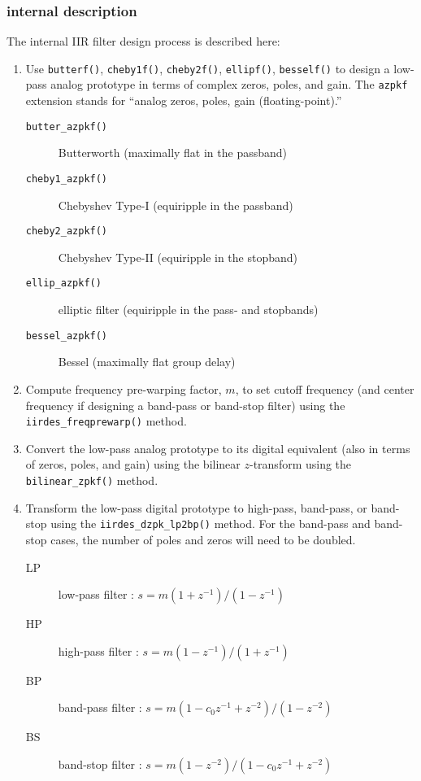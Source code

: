 \subsubsection{internal description}
\label{module:filter:iirdes:internal}
The internal IIR filter design process is described here:
\begin{enumerate}
\item Use {\tt butterf()}, {\tt cheby1f()}, {\tt cheby2f()}, {\tt ellipf()},
      {\tt besself()} to design a low-pass analog prototype in terms of
      complex zeros, poles, and gain.
      The {\tt azpkf} extension stands for ``analog zeros, poles, gain
      (floating-point).''

    \begin{description}
    \item[{\tt butter\_azpkf()}] Butterworth (maximally flat in the passband)
    \item[{\tt cheby1\_azpkf()}] Chebyshev Type-I (equiripple in the passband)
    \item[{\tt cheby2\_azpkf()}] Chebyshev Type-II (equiripple in the stopband)
    \item[{\tt ellip\_azpkf() }] elliptic filter (equiripple in the pass- and
        stopbands)
    \item[{\tt bessel\_azpkf()}] Bessel (maximally flat group delay)
    \end{description}

\item Compute frequency pre-warping factor, $m$, to set cutoff frequency (and
      center frequency if designing a band-pass or band-stop filter) using the
      {\tt iirdes\_freqprewarp()} method.

\item Convert the low-pass analog prototype to its digital equivalent (also in
      terms of zeros, poles, and gain) using the bilinear $z$-transform using
      the {\tt bilinear\_zpkf()} method.

\item Transform the low-pass digital prototype to high-pass, band-pass, or
      band-stop using the {\tt iirdes\_dzpk\_lp2bp()} method.
      For the band-pass and band-stop cases, the number of poles and zeros
      will need to be doubled.
    \begin{description}
    \item[LP] low-pass filter   : $s = m (1+z^{-1}) / (1-z^{-1})$
    \item[HP] high-pass filter  : $s = m (1-z^{-1}) / (1+z^{-1})$
    \item[BP] band-pass filter  : $s = m (1-c_0 z^{-1}+z^{-2}) / (1-z^{-2})$
    \item[BS] band-stop filter  : $s = m (1-z^{-2}) / (1-c_0 z^{-1}+z^{-2})$
    \end{description}


\end{enumerate}
